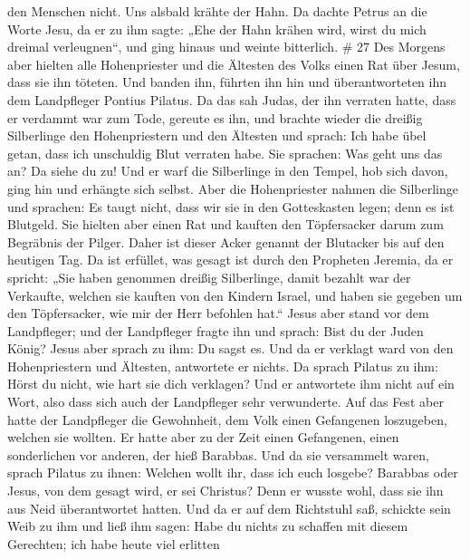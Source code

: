 den Menschen nicht. Uns alsbald krähte der Hahn.  Da dachte
Petrus an die Worte Jesu, da er zu ihm sagte: „Ehe der Hahn krähen wird,
wirst du mich dreimal verleugnen``, und ging hinaus und weinte
bitterlich. \# 27  Des Morgens aber hielten alle
Hohenpriester und die Ältesten des Volks einen Rat über Jesum, dass sie
ihn töteten.  Und banden ihn, führten ihn hin und
überantworteten ihn dem Landpfleger Pontius Pilatus.  Da das
sah Judas, der ihn verraten hatte, dass er verdammt war zum Tode,
gereute es ihn, und brachte wieder die dreißig Silberlinge den
Hohenpriestern und den Ältesten  und sprach: Ich habe übel
getan, dass ich unschuldig Blut verraten habe.  Sie
sprachen: Was geht uns das an? Da siehe du zu! Und er warf die
Silberlinge in den Tempel, hob sich davon, ging hin und erhängte sich
selbst.  Aber die Hohenpriester nahmen die Silberlinge und
sprachen: Es taugt nicht, dass wir sie in den Gotteskasten legen; denn
es ist Blutgeld.  Sie hielten aber einen Rat und kauften den
Töpfersacker darum zum Begräbnis der Pilger.  Daher ist
dieser Acker genannt der Blutacker bis auf den heutigen Tag.
 Da ist erfüllet, was gesagt ist durch den Propheten
Jeremia, da er spricht: „Sie haben genommen dreißig Silberlinge, damit
bezahlt war der Verkaufte, welchen sie kauften von den Kindern Israel,
 und haben sie gegeben um den Töpfersacker, wie mir der
Herr befohlen hat.``  Jesus aber stand vor dem Landpfleger;
und der Landpfleger fragte ihn und sprach: Bist du der Juden König?
Jesus aber sprach zu ihm: Du sagst es.  Und da er verklagt
ward von den Hohenpriestern und Ältesten, antwortete er nichts.
 Da sprach Pilatus zu ihm: Hörst du nicht, wie hart sie
dich verklagen?  Und er antwortete ihm nicht auf ein Wort,
also dass sich auch der Landpfleger sehr verwunderte.  Auf
das Fest aber hatte der Landpfleger die Gewohnheit, dem Volk einen
Gefangenen loszugeben, welchen sie wollten.  Er hatte aber
zu der Zeit einen Gefangenen, einen sonderlichen vor anderen, der hieß
Barabbas.  Und da sie versammelt waren, sprach Pilatus zu
ihnen: Welchen wollt ihr, dass ich euch losgebe? Barabbas oder Jesus,
von dem gesagt wird, er sei Christus?  Denn er wusste wohl,
dass sie ihn aus Neid überantwortet hatten.  Und da er auf
dem Richtstuhl saß, schickte sein Weib zu ihm und ließ ihm sagen: Habe
du nichts zu schaffen mit diesem Gerechten; ich habe heute viel erlitten
